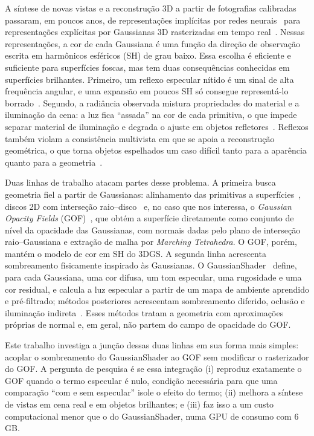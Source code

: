 \documentclass[12pt]{article}
\begin{document}
A síntese de novas vistas e a reconstrução 3D a partir de fotografias calibradas passaram, em poucos anos, de representações implícitas por redes neurais~\cite{mildenhall2020nerf} para representações explícitas por Gaussianas 3D rasterizadas em tempo real~\cite{kerbl2023gaussian,bao2025survey}.
Nessas representações, a cor de cada Gaussiana é uma função da direção de observação escrita em harmônicos esféricos (SH) de grau baixo.
Essa escolha é eficiente e suficiente para superfícies foscas, mas tem duas consequências conhecidas em superfícies brilhantes.
Primeiro, um reflexo especular nítido é um sinal de alta frequência angular, e uma expansão em poucos SH só consegue representá-lo borrado~\cite{verbin2022refnerf,mezieres2022hvl}.
Segundo, a radiância observada mistura propriedades do material e a iluminação da cena: a luz fica ``assada'' na cor de cada primitiva, o que impede separar material de iluminação e degrada o ajuste em objetos refletores~\cite{jiang2024gaussianshader,wu2025deferredgs}.
Reflexos também violam a consistência multivista em que se apoia a reconstrução geométrica, o que torna objetos espelhados um caso difícil tanto para a aparência quanto para a geometria~\cite{liu2023nero,li2026pdrgs}.

Duas linhas de trabalho atacam partes desse problema.
A primeira busca geometria fiel a partir de Gaussianas: alinhamento das primitivas a superfícies~\cite{guedon2024sugar}, discos 2D com interseção raio--disco~\cite{huang2024twodgs} e, no caso que nos interessa, o \emph{Gaussian Opacity Fields} (GOF)~\cite{yu2024gof}, que obtém a superfície diretamente como conjunto de nível da opacidade das Gaussianas, com normais dadas pelo plano de interseção raio--Gaussiana e extração de malha por \emph{Marching Tetrahedra}.
O GOF, porém, mantém o modelo de cor em SH do 3DGS.
A segunda linha acrescenta sombreamento fisicamente inspirado às Gaussianas.
O GaussianShader~\cite{jiang2024gaussianshader} define, para cada Gaussiana, uma cor difusa, um tom especular, uma rugosidade e uma cor residual, e calcula a luz especular a partir de um mapa de ambiente aprendido e pré-filtrado; métodos posteriores acrescentam sombreamento diferido, oclusão e iluminação indireta~\cite{liang2024gsir,shi2025gir,yao2025refgaussian,gu2025irgs}.
Esses métodos tratam a geometria com aproximações próprias de normal e, em geral, não partem do campo de opacidade do GOF.

Este trabalho investiga a junção dessas duas linhas em sua forma mais simples: acoplar o sombreamento do GaussianShader ao GOF sem modificar o rasterizador do GOF.
A pergunta de pesquisa é se essa integração (i) reproduz exatamente o GOF quando o termo especular é nulo, condição necessária para que uma comparação ``com e sem especular'' isole o efeito do termo; (ii) melhora a síntese de vistas em cena real e em objetos brilhantes; e (iii) faz isso a um custo computacional menor que o do GaussianShader, numa GPU de consumo com 6\,GB.
\end{document}

